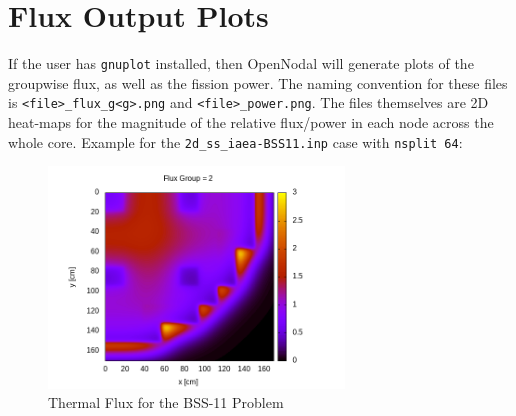\section{Flux Output Plots}

If the user has \verb"gnuplot" installed, then OpenNodal will generate plots of the groupwise flux, as well as the fission power.
The naming convention for these files is \verb"<file>_flux_g<g>.png" and \verb"<file>_power.png".
The files themselves are 2D heat-maps for the magnitude of the relative flux/power in each node across the whole core.
Example for the \verb"2d_ss_iaea-BSS11.inp" case with \verb"nsplit 64":
\begin{figure}[H]
\centering
  \includegraphics[width=0.7\textwidth]{chapters/output_form/images/2d_ss_iaea-BSS11_flux_g2.png}
  \caption{Thermal Flux for the BSS-11 Problem}
\end{figure}